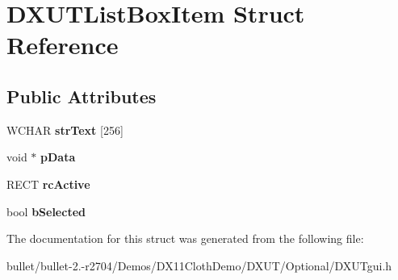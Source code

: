 \hypertarget{struct_d_x_u_t_list_box_item}{\section{D\+X\+U\+T\+List\+Box\+Item Struct Reference}
\label{struct_d_x_u_t_list_box_item}
}
\subsection*{Public Attributes}
\begin{DoxyCompactItemize}
\item 
\hypertarget{struct_d_x_u_t_list_box_item_afae48ae64202ceb407e7e61292187003}{W\+C\+H\+A\+R {\bfseries str\+Text} \mbox{[}256\mbox{]}}\label{struct_d_x_u_t_list_box_item_afae48ae64202ceb407e7e61292187003}

\item 
\hypertarget{struct_d_x_u_t_list_box_item_ab5321ce735e7a9f9adb77f90cea3c9bc}{void $\ast$ {\bfseries p\+Data}}\label{struct_d_x_u_t_list_box_item_ab5321ce735e7a9f9adb77f90cea3c9bc}

\item 
\hypertarget{struct_d_x_u_t_list_box_item_ab469e8349577c965969b6055c46b5385}{R\+E\+C\+T {\bfseries rc\+Active}}\label{struct_d_x_u_t_list_box_item_ab469e8349577c965969b6055c46b5385}

\item 
\hypertarget{struct_d_x_u_t_list_box_item_afe3354ef18fa6419ed65eef48005c34e}{bool {\bfseries b\+Selected}}\label{struct_d_x_u_t_list_box_item_afe3354ef18fa6419ed65eef48005c34e}

\end{DoxyCompactItemize}


The documentation for this struct was generated from the following file\+:\begin{DoxyCompactItemize}
\item 
bullet/bullet-\/2.-\/r2704/\+Demos/\+D\+X11\+Cloth\+Demo/\+D\+X\+U\+T/\+Optional/D\+X\+U\+Tgui.\+h\end{DoxyCompactItemize}

